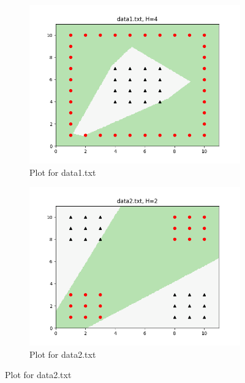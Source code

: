\documentclass{article}
\begin{document}
\begin{figure}[H] %
  \centering

  \begin{subfigure}[b]{0.48\textwidth} %
    \centering
    \includegraphics[width=\textwidth, height=0.35\textheight, keepaspectratio]{./plots/data1_H4.png} 
    \caption{Plot for data1.txt}
    \label{fig:d1}
  \end{subfigure}
  \hfill %
  \begin{subfigure}[b]{0.48\textwidth}
    \centering
    \includegraphics[width=\textwidth, height=0.35\textheight, keepaspectratio]{./plots/data2_H2.png}
    \caption{Plot for data2.txt}
    \label{fig:d2}
  \end{subfigure}


\end{figure}
\end{document}
